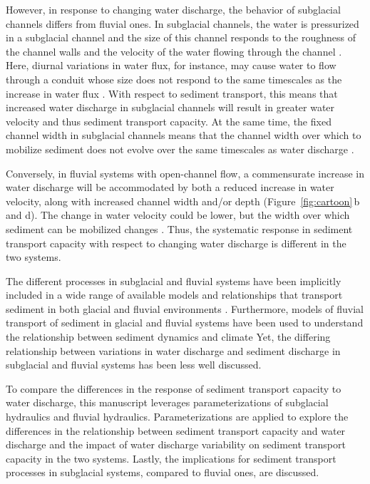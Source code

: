 \documentclass[11pt]{article}
\begin{document}
\begin{spacing}{1}
          However, in response to changing water discharge, the behavior of subglacial channels differs from fluvial ones.
          In subglacial channels, the water is pressurized in a subglacial channel and the size of this channel responds to the roughness of the channel walls and the velocity of the water flowing through the channel \citep[Figure~\ref{fig:cartoon}\,a and c; e.g. ][]{rothlisberger1972}.
          Here, diurnal variations in water flux, for instance, may cause water to flow through a conduit whose size does not respond to the same timescales as the increase in water flux \citep{rothlisberger1972}.
          With respect to sediment transport, this means that increased water discharge in subglacial channels will result in greater water velocity and thus sediment transport capacity.
          At the same time, the fixed channel width in subglacial channels means that the channel width over which to mobilize sediment does not evolve over the same timescales as water discharge \citep[e.g.][]{werder2010}.
          
          Conversely, in fluvial systems with open-channel flow, a commensurate increase in water discharge will be accommodated by both a reduced increase in water velocity, along with increased channel width and/or depth (Figure~\ref{fig:cartoon}\,b and d).
          The change in water velocity could be lower, but the width over which sediment can be mobilized changes \citep{leopold1953}.
          Thus, the systematic response in sediment transport capacity with respect to changing water discharge is  different in the two systems.
        
          The different processes in subglacial and fluvial systems have been implicitly included in a wide range of available models and relationships that transport sediment in both glacial and fluvial environments \citep[e.g.][]{walder1994,tucker1997,beaud2018,wickert2019}.
          Furthermore, models of fluvial transport of sediment in glacial and fluvial systems have been used to understand the relationship between sediment dynamics and climate \citep[e.g.][]{tucker1997,delaney2020}
          Yet, the differing relationship between variations in water discharge and sediment discharge in subglacial and fluvial systems has been less well discussed.
        
          To compare the differences in the response of sediment transport capacity to water discharge, this manuscript leverages parameterizations of subglacial hydraulics and fluvial hydraulics.
          Parameterizations are applied to explore the differences in the relationship between sediment transport capacity and water discharge and the impact of water discharge variability on sediment transport capacity in the two systems.
          Lastly, the implications for sediment transport processes in subglacial systems, compared to fluvial ones, are discussed.
        

\end{spacing}
\end{document}
